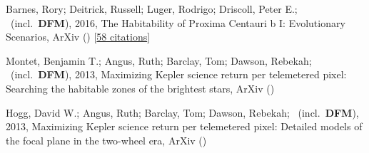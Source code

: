 \item[{\color{numcolor}\scriptsize3}] Barnes, Rory; Deitrick, Russell; Luger, Rodrigo; Driscoll, Peter E.; \etal\ (incl.\ \textbf{DFM}), 2016, The Habitability of Proxima Centauri b I: Evolutionary Scenarios, ArXiv () [\href{https://ui.adsabs.harvard.edu/abs/2016arXiv160806919B}{58 citations}]

\item[{\color{numcolor}\scriptsize2}] Montet, Benjamin T.; Angus, Ruth; Barclay, Tom; Dawson, Rebekah; \etal\ (incl.\ \textbf{DFM}), 2013, Maximizing Kepler science return per telemetered pixel: Searching the habitable zones of the brightest stars, ArXiv ()

\item[{\color{numcolor}\scriptsize1}] Hogg, David W.; Angus, Ruth; Barclay, Tom; Dawson, Rebekah; \etal\ (incl.\ \textbf{DFM}), 2013, Maximizing Kepler science return per telemetered pixel: Detailed models of the focal plane in the two-wheel era, ArXiv ()